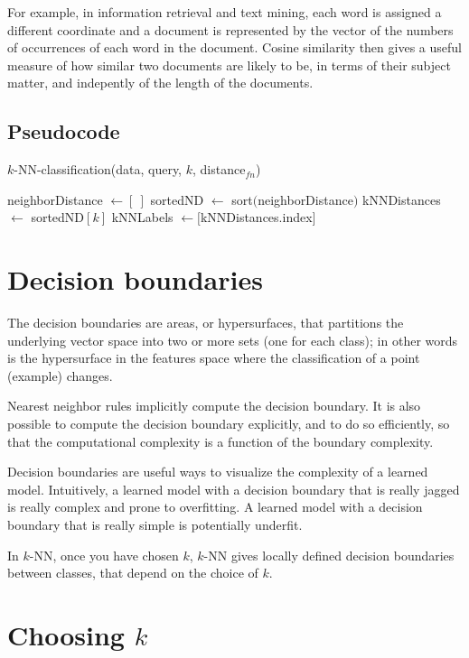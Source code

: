 For example, in information retrieval and text mining, each word is assigned a different coordinate and a document is represented by the vector of the numbers of occurrences of each word in the document. Cosine similarity then gives a useful measure of how similar two documents are likely to be, in terms of their subject matter, and indepently of the length of the documents.

\subsection{Pseudocode}
\begin{algorithm}
\caption{$k$-NN-classification(data, query, $k$, distance$_{fn}$)}
\label{alg:k-nn}
neighborDistance $\gets [\ ]$\;
sortedND $\gets$ sort$($neighborDistance$)$\;
kNNDistances $\gets$ sortedND$[k]$
kNNLabels $\gets [$kNNDistances.index$]$
\end{algorithm}


\section{Decision boundaries}
The decision boundaries are areas, or hypersurfaces, that partitions the underlying vector space into two or more sets (one for each class); in other words is the hypersurface in the features space where the classification of a point (example) changes.

Nearest neighbor rules implicitly compute the decision boundary. It is also possible to compute the decision boundary explicitly, and to do so efficiently, so that the computational complexity is a function of the boundary complexity.

Decision boundaries are useful ways to visualize the complexity of a learned model. Intuitively, a learned model with a decision boundary that is really jagged is really complex and prone to overfitting. A learned model with a decision boundary that is really simple is potentially underfit.

In \(k\)-NN, once you have chosen \(k\), \(k\)-NN gives locally defined decision boundaries between classes, that depend on the choice of \(k\).

\section{Choosing \(k\)}

